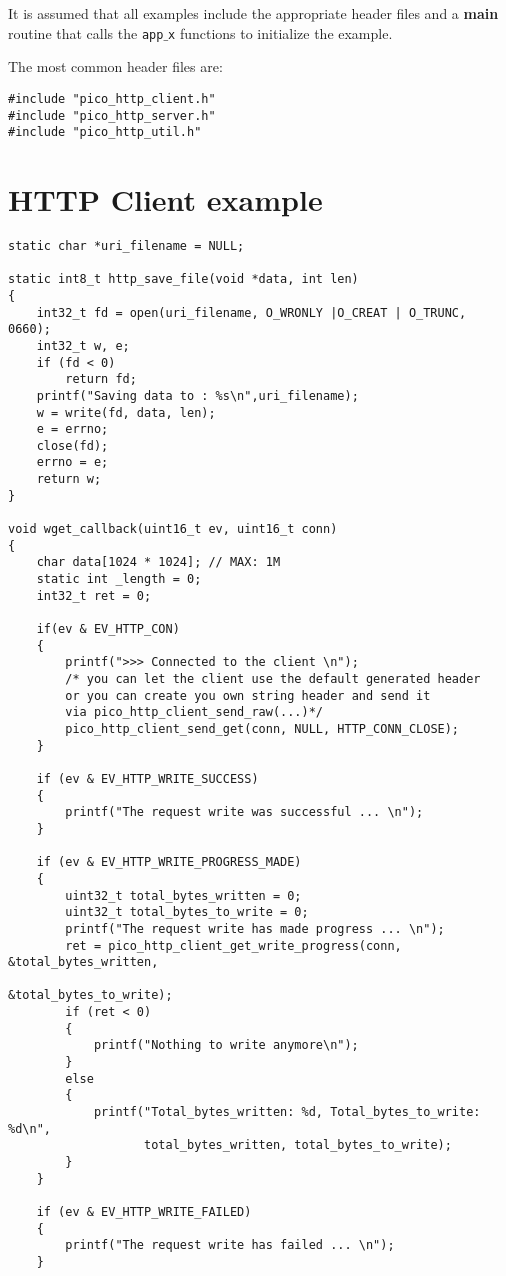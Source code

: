 It is assumed that all examples include the appropriate header files
and a \textbf{main} routine that calls the \texttt{app$\_$x} functions to initialize
the example.

The most common header files are:
\begin{verbatim}
#include "pico_http_client.h"
#include "pico_http_server.h"
#include "pico_http_util.h"
\end{verbatim}

\section{HTTP Client example}
\begin{verbatim}
static char *uri_filename = NULL;

static int8_t http_save_file(void *data, int len)
{
    int32_t fd = open(uri_filename, O_WRONLY |O_CREAT | O_TRUNC, 0660);
    int32_t w, e;
    if (fd < 0)
        return fd;
    printf("Saving data to : %s\n",uri_filename);
    w = write(fd, data, len);
    e = errno;
    close(fd);
    errno = e;
    return w;
}

void wget_callback(uint16_t ev, uint16_t conn)
{
    char data[1024 * 1024]; // MAX: 1M
    static int _length = 0;
    int32_t ret = 0;

    if(ev & EV_HTTP_CON)
    {
        printf(">>> Connected to the client \n");
        /* you can let the client use the default generated header
        or you can create you own string header and send it
        via pico_http_client_send_raw(...)*/
        pico_http_client_send_get(conn, NULL, HTTP_CONN_CLOSE);
    }

    if (ev & EV_HTTP_WRITE_SUCCESS)
    {
        printf("The request write was successful ... \n");
    }

    if (ev & EV_HTTP_WRITE_PROGRESS_MADE)
    {
        uint32_t total_bytes_written = 0;
        uint32_t total_bytes_to_write = 0;
        printf("The request write has made progress ... \n");
        ret = pico_http_client_get_write_progress(conn, &total_bytes_written,
                                                  &total_bytes_to_write);
        if (ret < 0)
        {
            printf("Nothing to write anymore\n");
        }
        else
        {
            printf("Total_bytes_written: %d, Total_bytes_to_write: %d\n",
                   total_bytes_written, total_bytes_to_write);
        }
    }

    if (ev & EV_HTTP_WRITE_FAILED)
    {
        printf("The request write has failed ... \n");
    }


\end{verbatim}
